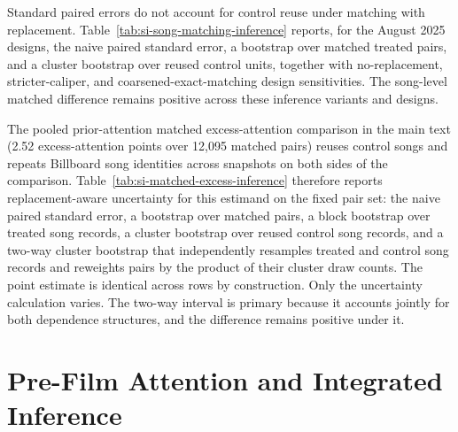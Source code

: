\documentclass[11pt]{article}
\begin{document}




Standard paired errors do not account for control reuse under matching with replacement. Table~\ref{tab:si-song-matching-inference} reports, for the August 2025 designs, the naive paired standard error, a bootstrap over matched treated pairs, and a cluster bootstrap over reused control units, together with no-replacement, stricter-caliper, and coarsened-exact-matching design sensitivities. The song-level matched difference remains positive across these inference variants and designs.



{\sloppy The pooled prior-attention matched excess-attention comparison in the main text (2.52 excess-attention points over 12,095 matched pairs) reuses control songs and repeats Billboard song identities across snapshots on both sides of the comparison. Table~\ref{tab:si-matched-excess-inference} therefore reports replacement-aware uncertainty for this estimand on the fixed pair set: the naive paired standard error, a bootstrap over matched pairs, a block bootstrap over treated song records, a cluster bootstrap over reused control song records, and a two-way cluster bootstrap that independently resamples treated and control song records and reweights pairs by the product of their cluster draw counts. The point estimate is identical across rows by construction. Only the uncertainty calculation varies. The two-way interval is primary because it accounts jointly for both dependence structures, and the difference remains positive under it.\par}



\section*{Pre-Film Attention and Integrated Inference}
\end{document}
